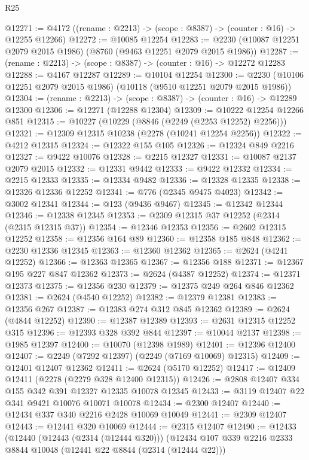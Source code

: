 \begin{lexlean}{R25}
\begin{coremodule}
@12271 := @4172 ((rename : @2213) -> (scope : @8387) -> (counter : @16) -> @12255 @12266)
@12272 := @10085 @12254
@12283 := @2230 (@10087 @12251 @2079 @2015 @1986) (@8760 (@9463 @12251 @2079 @2015 @1986))
@12287 := (rename : @2213) -> (scope : @8387) -> (counter : @16) -> @12272 @12283
@12288 := @4167 @12287
@12289 := @10104 @12254
@12300 := @2230 (@10106 @12251 @2079 @2015 @1986) (@10118 (@9510 @12251 @2079 @2015 @1986))
@12304 := (rename : @2213) -> (scope : @8387) -> (counter : @16) -> @12289 @12300
@12306 := @12271 (@12288 @12304)
@12309 := @10222 @12254 @12266 @851
@12315 := @10227 (@10229 (@8846 (@2249 (@2253 @12252) @2256)))
@12321 := @12309 @12315 @10238 (@2278 (@10241 @12254 @2256))
@12322 := @4212 @12315
@12324 := @12322 @155 @105
@12326 := @12324 @849 @2216
@12327 := @9422 @10076
@12328 := @2215 @12327
@12331 := @10087 @2137 @2079 @2015
@12332 := @12331 @9442
@12333 := @9422 @12332
@12334 := @2215 @12333
@12335 := @12334 @9482
@12336 := @12328 @12335
@12338 := @12326 @12336 @12252
@12341 := @776 (@2345 @9475 @4023)
@12342 := @3002 @12341
@12344 := @123 (@9436 @9467)
@12345 := @12342 @12344
@12346 := @12338 @12345
@12353 := @2309 @12315 @37 @12252 (@2314 (@2315 @12315 @37))
@12354 := @12346 @12353
@12356 := @2602 @12315 @12252
@12358 := @12356 @164 @89
@12360 := @12358 @185 @848
@12362 := @2230 @12336 @12345
@12363 := @12360 @12362
@12365 := @2624 (@4241 @12252)
@12366 := @12363 @12365
@12367 := @12356 @188
@12371 := @12367 @195 @227 @847 @12362
@12373 := @2624 (@4387 @12252)
@12374 := @12371 @12373
@12375 := @12356 @230
@12379 := @12375 @249 @264 @846 @12362
@12381 := @2624 (@4540 @12252)
@12382 := @12379 @12381
@12383 := @12356 @267
@12387 := @12383 @274 @312 @845 @12362
@12389 := @2624 (@4844 @12252)
@12390 := @12387 @12389
@12393 := @2631 @12315 @12252 @315
@12396 := @12393 @328 @392 @844
@12397 := @10044 @2137
@12398 := @1985 @12397
@12400 := @10070 (@12398 @1989)
@12401 := @12396 @12400
@12407 := @2249 (@7292 @12397) (@2249 (@7169 @10069) @12315)
@12409 := @12401 @12407 @12362
@12411 := @2624 (@5170 @12252)
@12417 := @12409 @12411 (@2278 (@2279 @328 @12400 @12315))
@12426 := @2808 @12407 @334 @155 @342 @391 @12327 @12335 @10078 @12345
@12433 := @3119 @12407 @22 @341 @9421 @10076 @10071 @10078
@12434 := @2300 @12407
@12440 := @12434 @337 @340 @2216 @2428 @10069 @10049
@12441 := @2309 @12407
@12443 := @12441 @320 @10069
@12444 := @2315 @12407
@12490 := @12433
    (@12440
      (@12443 (@2314 (@12444 @320)))
      (@12434
        @107
        @339
        @2216
        @2333
        @8844
        @10048
        (@12441 @22 @8844 (@2314 (@12444 @22)))

\end{coremodule}
\end{lexlean}
